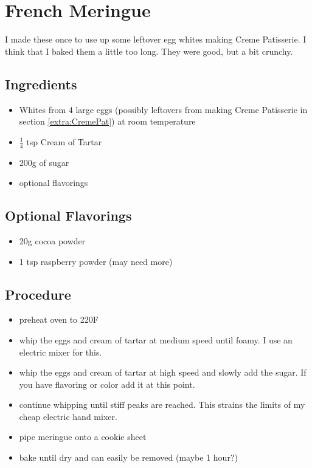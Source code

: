 \documentclass[10pt, openany]{book}
\begin{document}
\section{French Meringue}
\label{extra:FrenchMeringue}
I made these once to use up some leftover egg whites making Creme Patisserie.  I think that I baked them a little too long.  They were good, but
a bit crunchy.

\subsection{Ingredients}
\begin{itemize}
  \item Whites from 4 large eggs (possibly leftovers from making Creme Patisserie in section \ref{extra:CremePat}) at room temperature
  \item $\frac{1}{4}$ tsp Cream of Tartar
  \item 200g of sugar
  \item optional flavorings
\end{itemize}
\subsection{Optional Flavorings}
\begin{itemize}
  \item 20g cocoa powder
  \item 1 tsp raspberry powder (may need more)
\end{itemize}
\subsection{Procedure}
\begin{itemize}
  \item preheat oven to 220\degree{}F
  \item whip the eggs and cream of tartar at medium speed until foamy.  I use an electric mixer for this.
  \item whip the eggs and cream of tartar at high speed and slowly add the sugar.  If you have flavoring or color add it at this point.
  \item continue whipping until stiff peaks are reached.  This strains the limits of my cheap electric hand mixer.
  \item pipe meringue onto a cookie sheet
  \item bake until dry and can easily be removed (maybe 1 hour?)
\end{itemize}
\end{document}
